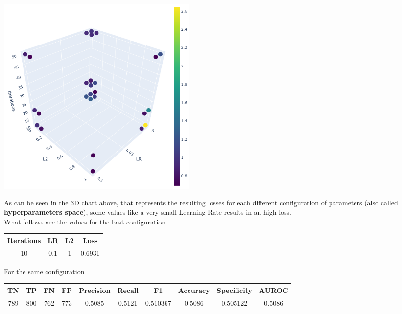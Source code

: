 \documentclass[
	letterpaper, %
	10pt, %
]{class}
\begin{document}
\begin{center}
    \includegraphics[width=10cm]{../images/3d.png}
\end{center}

As can be seen in the 3D chart above, that represents the resulting losses for each different configuration of parameters (also called \textbf{hyperparameters space}), some values like a very small Learning Rate results in an high loss.\\
What follows are the values for the best configuration

\begin{center}
    \begin{tabular}{ |c|c|c|c| }
        \hline
        Iterations & LR  & L2 & Loss   \\
        \hline
        10         & 0.1 & 1  & 0.6931 \\
        \hline
    \end{tabular}
\end{center}

For the same configuration

\begin{center}
    \begin{tabular}{ |c|c|c|c|c|c|c|c|c|c| }
        \hline
        TN  & TP  & FN  & FP  & Precision & Recall & F1       & Accuracy & Specificity & AUROC  \\
        \hline
        789 & 800 & 762 & 773 & 0.5085    & 0.5121 & 0.510367 & 0.5086   & 0.505122    & 0.5086 \\
        \hline
    \end{tabular}
\end{center}
\end{document}

